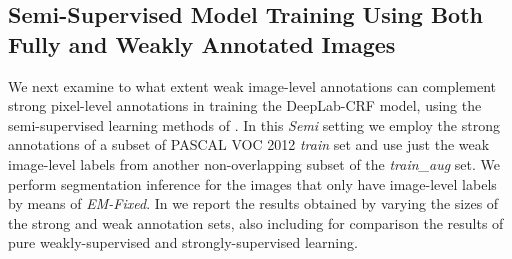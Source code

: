 \begin{table}
  \centering
  \caption{Our DeepLab-CRF VOC \textsl{val} IOU (\%) results with
    image-level weak annotations in training \vs previous methods.} 
  \label{tb:weak_annot}
\end{table}




\subsection{Semi-Supervised Model Training Using Both Fully and Weakly Annotated Images}
\label{sec:test_semi}

We next examine to what extent weak image-level annotations can
complement strong pixel-level annotations in training the DeepLab-CRF
model, using the semi-supervised learning methods of
. In this \textsl{Semi} setting we employ the
strong annotations of a subset of PASCAL VOC 2012 \textsl{train} set
and use just the weak image-level labels from another non-overlapping
subset of the \textsl{train\_aug} set. We perform segmentation
inference for the images that only have image-level labels by means of
\textsl{EM-Fixed}. In  we report the 
results obtained by varying the sizes of the strong and weak
annotation sets, also including for comparison the results of pure
weakly-supervised and strongly-supervised learning.

